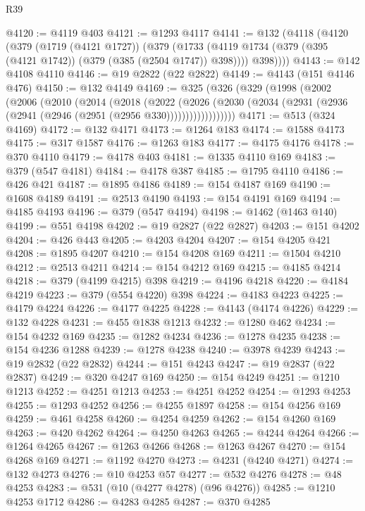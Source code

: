 \begin{lexlean}{R39}
\begin{coremodule}
@4120 := @4119 @403
@4121 := @1293 @4117
@4141 := @132
    (@4118
      (@4120
        (@379
          (@1719 (@4121 @1727))
          (@379
            (@1733 (@4119 @1734 (@379 (@395 (@4121 @1742)) (@379 (@385 (@2504 @1747)) @398))))
            @398))))
@4143 := @142 @4108 @4110
@4146 := @19 @2822 (@22 @2822)
@4149 := @4143 (@151 @4146 @476)
@4150 := @132 @4149
@4169 := @325
    (@326
      (@329
        (@1998
          (@2002
            (@2006
              (@2010
                (@2014
                  (@2018
                    (@2022
                      (@2026
                        (@2030
                          (@2034 (@2931 (@2936 (@2941 (@2946 (@2951 (@2956 @330))))))))))))))))))
@4171 := @513 (@324 @4169)
@4172 := @132 @4171
@4173 := @1264 @183
@4174 := @1588 @4173
@4175 := @317 @1587
@4176 := @1263 @183
@4177 := @4175 @4176
@4178 := @370 @4110
@4179 := @4178 @403
@4181 := @1335 @4110 @169
@4183 := @379 (@547 @4181)
@4184 := @4178 @387
@4185 := @1795 @4110
@4186 := @426 @421
@4187 := @1895 @4186
@4189 := @154 @4187 @169
@4190 := @1608 @4189
@4191 := @2513 @4190
@4193 := @154 @4191 @169
@4194 := @4185 @4193
@4196 := @379 (@547 @4194)
@4198 := @1462 (@1463 @140)
@4199 := @551 @4198
@4202 := @19 @2827 (@22 @2827)
@4203 := @151 @4202
@4204 := @426 @443
@4205 := @4203 @4204
@4207 := @154 @4205 @421
@4208 := @1895 @4207
@4210 := @154 @4208 @169
@4211 := @1504 @4210
@4212 := @2513 @4211
@4214 := @154 @4212 @169
@4215 := @4185 @4214
@4218 := @379 (@4199 @4215) @398
@4219 := @4196 @4218
@4220 := @4184 @4219
@4223 := @379 (@554 @4220) @398
@4224 := @4183 @4223
@4225 := @4179 @4224
@4226 := @4177 @4225
@4228 := @4143 (@4174 @4226)
@4229 := @132 @4228
@4231 := @455 @1838 @1213
@4232 := @1280 @462
@4234 := @154 @4232 @169
@4235 := @1282 @4234
@4236 := @1278 @4235
@4238 := @154 @4236 @1288
@4239 := @1278 @4238
@4240 := @3978 @4239
@4243 := @19 @2832 (@22 @2832)
@4244 := @151 @4243
@4247 := @19 @2837 (@22 @2837)
@4249 := @320 @4247 @169
@4250 := @154 @4249
@4251 := @1210 @1213
@4252 := @4251 @1213
@4253 := @4251 @4252
@4254 := @1293 @4253
@4255 := @1293 @4252
@4256 := @4255 @1897
@4258 := @154 @4256 @169
@4259 := @461 @4258
@4260 := @4254 @4259
@4262 := @154 @4260 @169
@4263 := @420 @4262
@4264 := @4250 @4263
@4265 := @4244 @4264
@4266 := @1264 @4265
@4267 := @1263 @4266
@4268 := @1263 @4267
@4270 := @154 @4268 @169
@4271 := @1192 @4270
@4273 := @4231 (@4240 @4271)
@4274 := @132 @4273
@4276 := @10 @4253 @57
@4277 := @532 @4276
@4278 := @48 @4253
@4283 := @531 (@10 (@4277 @4278) (@96 @4276))
@4285 := @1210 @4253 @1712
@4286 := @4283 @4285
@4287 := @370 @4285

\end{coremodule}
\end{lexlean}
